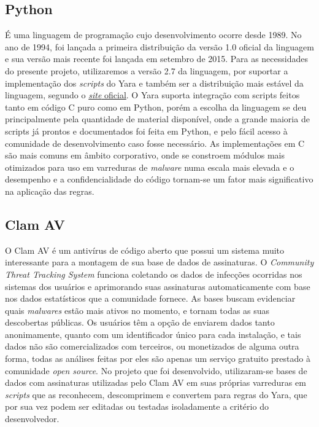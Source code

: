\subsection{Python}
\label{sub:python}

É uma linguagem de programação cujo desenvolvimento ocorre desde 1989. No ano de
1994, foi lançada a primeira distribuição da versão 1.0 oficial da linguagem e
sua versão mais recente foi lançada em setembro de 2015. Para as necessidades do
presente projeto, utilizaremos a versão 2.7 da linguagem, por suportar a
implementação dos \textit{scripts} do Yara e também ser a distribuição mais
estável da linguagem, segundo o \href{www.python.org}{\textit{site} oficial}. O
Yara suporta integração com scripts feitos tanto em código C puro como em
Python, porém a escolha da linguagem se deu principalmente pela quantidade de
material disponível, onde a grande maioria de scripts já prontos e documentados
foi feita em Python,  e pelo fácil acesso à comunidade de desenvolvimento caso
fosse necessário. As implementações em C são mais comuns em âmbito corporativo,
onde se constroem módulos mais otimizados para uso em varreduras de
\textit{malware} numa escala mais elevada e o desempenho e a confidencialidade
do código tornam-se um fator mais significativo na aplicação das regras.

\subsection{Clam AV}
\label{sub:clamav}

O Clam AV é um antivírus de código aberto que possui um sistema muito
interessante para a montagem de sua base de dados de assinaturas. O
\textit{Community Threat Tracking System} funciona coletando os dados de
infecções ocorridas nos sistemas dos usuários e aprimorando suas assinaturas
automaticamente com base nos dados estatísticos que a comunidade fornece. As
bases buscam evidenciar quais \textit{malwares} estão mais ativos no momento, e
tornam todas as suas descobertas públicas. Os usuários têm a opção de enviarem
dados tanto anonimamente, quanto com um identificador único para cada
instalação, e tais dados não são comercializados com terceiros, ou monetizados
de alguma outra forma, todas as análises feitas por eles são apenas um serviço
gratuito prestado à comunidade \textit{open source}. No projeto que foi
desenvolvido, utilizaram-se bases de dados com assinaturas utilizadas pelo Clam
AV em suas próprias varreduras em \textit{scripts} que as reconhecem, descomprimem e
convertem para regras do Yara, que por sua vez podem ser editadas ou testadas
isoladamente a critério do desenvolvedor.


